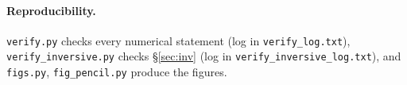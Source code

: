 \documentclass[11pt]{article}
\theoremstyle{definition}\newtheorem{definition}[theorem]{Definition}\newtheorem{remark}[theorem]{Remark}
\begin{document}
\paragraph{Reproducibility.} \texttt{verify.py} checks every numerical statement (log in \texttt{verify\_log.txt}), \texttt{verify\_inversive.py} checks \S\ref{sec:inv} (log in \texttt{verify\_inversive\_log.txt}), and \texttt{figs.py}, \texttt{fig\_pencil.py} produce the figures.
\end{document}
